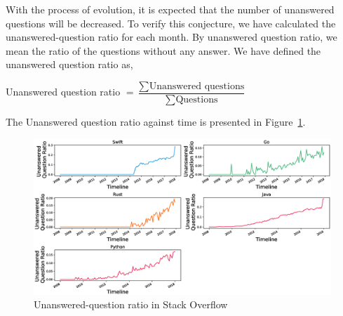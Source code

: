 
With the process of evolution, it is expected that the number of unanswered questions will be decreased. To verify this conjecture, we have calculated the unanswered-question ratio for each month. By unanswered question ratio, we mean the ratio of the questions without any answer. We have defined the unanswered question ratio as,

Unanswered question ratio $ = \dfrac{\sum \text{Unanswered questions}}{\sum \text{Questions}}$

The Unanswered question ratio against time is presented in Figure~\ref{fig:Unanswered-question ratio}.
\begin{figure}[htbp]
\centering
\includegraphics[scale=0.38]{figures/UnansweredQuestionRatio.eps}
\caption{Unanswered-question ratio in Stack Overflow}
\label{fig:Unanswered-question ratio}
\end{figure}


